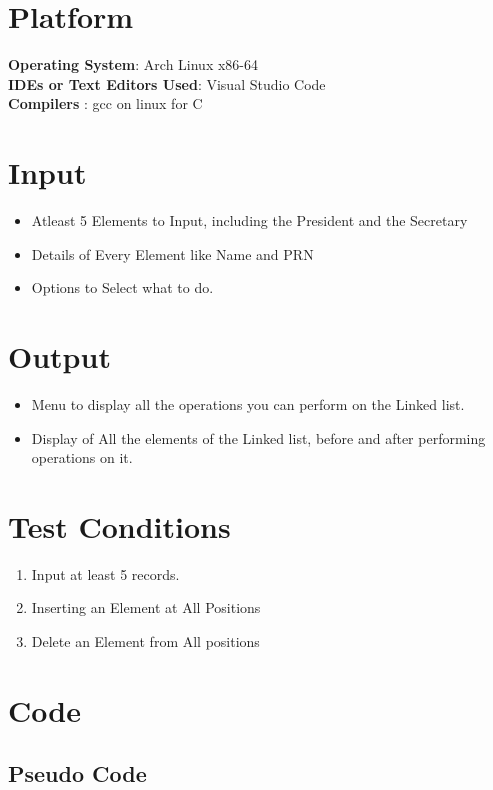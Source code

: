 \documentclass[11pt]{article}
\begin{document}
\section{Platform}
\textbf{Operating System}: Arch Linux x86-64 \\
\textbf{IDEs or Text Editors Used}: Visual Studio Code\\
\textbf{Compilers} : gcc on linux for C\\

\section{Input}

\begin{itemize}
	\item Atleast 5 Elements to Input, including the President and the Secretary
	\item Details of Every Element like Name and PRN
	\item Options to Select what to do.
\end{itemize}

\section{Output}
\begin{itemize}
	\item Menu to display all the operations you can perform on the Linked list.
	\item Display of All the elements of the Linked list, before and after performing operations on it.
\end{itemize}

\section{Test Conditions}
\begin{enumerate}
	\item Input at least 5 records.
	\item Inserting an Element at All Positions
	\item Delete an Element from All positions
\end{enumerate}

\section{Code}
\subsection{Pseudo Code}
\end{document}
